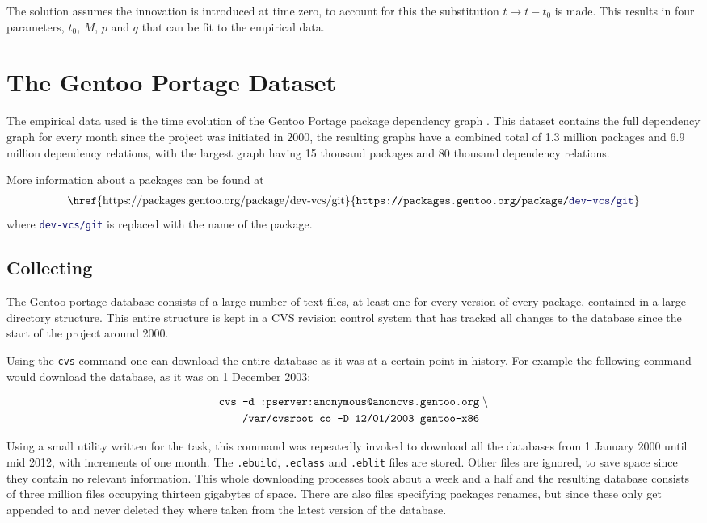 \documentclass[smallextended,final]{svjour3}
\begin{document}
The solution assumes the innovation is introduced at time zero, to account for this the substitution $t \rightarrow t - t_0$ is made. This results in four parameters, $t_0$, $M$, $p$ and $q$ that can be fit to the empirical data.


\section{The Gentoo Portage Dataset}

The empirical data used is the time evolution of the Gentoo Portage package dependency graph \citep{rem14}. This dataset contains the full dependency graph for every month since the project was initiated in $2000$, the resulting graphs have a combined total of 1.3 million packages and 6.9 million dependency relations, with the largest graph having 15 thousand packages and 80 thousand dependency relations.

More information about a packages can be found at
\begin{align}
\mbox{
\href{https://packages.gentoo.org/package/dev-vcs/git}{\texttt{https://packages.gentoo.org/package/\textcolor{MidnightBlue}{dev-vcs/git}}}
}\label{url:pkg}
\end{align}
where \texttt{\textcolor{MidnightBlue}{dev-vcs/git}} is replaced with the name of the package.

\subsection{Collecting}

The Gentoo portage database consists of a large number of text files, at least one for every version of every package, contained in a large directory structure. This entire structure is kept in a CVS revision control system that has tracked all changes to the database since the start of the project around 2000.

Using the \verb|cvs| command one can download the entire database as it was at a certain point in history. For example the following command would download the database, as it was on 1 December 2003:

\begin{align}
\mbox{\texttt{cvs -d :pserver:anonymous@anoncvs.gentoo.org}}&\;\backslash \notag\\
\mbox{\texttt{  /var/cvsroot co -D 12/01/2003 gentoo-x86}}
\label{cmd:cvs}
\end{align}

Using a small utility written for the task, this command was repeatedly invoked to download all the databases from 1 January 2000 until mid 2012, with increments of one month. The \verb|.ebuild|, \verb|.eclass| and \verb|.eblit| files are stored. Other files are ignored, to save space since they contain no relevant information. This whole downloading processes took about a week and a half and the resulting database consists of three million files occupying thirteen gigabytes of space. There are also files specifying packages renames, but since these only get appended to and never deleted they where taken from the latest version of the database.
\end{document}
